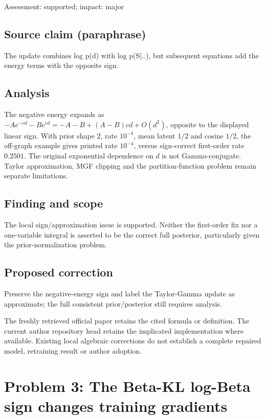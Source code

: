 \documentclass[11pt]{article}
\begin{document}
Assessment: supported; impact: major

\subsection*{Source claim (paraphrase)}

The update combines log p(d) with log p(S|..), but subsequent equations add the energy terms with the opposite sign.

\subsection*{Analysis}

The negative energy expands as \(-Ae^{-cd}-Be^{cd}=-A-B+(A-B)cd+O(d^2)\), opposite to the displayed linear sign. With prior shape \(2\), rate \(10^{-4}\), mean latent \(1/2\) and cosine \(1/2\), the off-graph example gives printed rate \(10^{-4}\), versus sign-correct first-order rate \(0.2501\). The original exponential dependence on \(d\) is not Gamma-conjugate. Taylor approximation, MGF clipping and the partition-function problem remain separate limitations.

\subsection*{Finding and scope}

The local sign/approximation issue is supported. Neither the first-order fix nor a one-variable integral is asserted to be the correct full posterior, particularly given the prior-normalization problem.

\subsection*{Proposed correction}

Preserve the negative-energy sign and label the Taylor-Gamma update as approximate; the full consistent prior/posterior still requires analysis.

The freshly retrieved official paper retains the cited formula or definition. The current author repository head retains the implicated implementation where available. Existing local algebraic corrections do not establish a complete repaired model, retraining result or author adoption.

\section*{Problem 3: The Beta-KL log-Beta sign changes training gradients}
\end{document}
